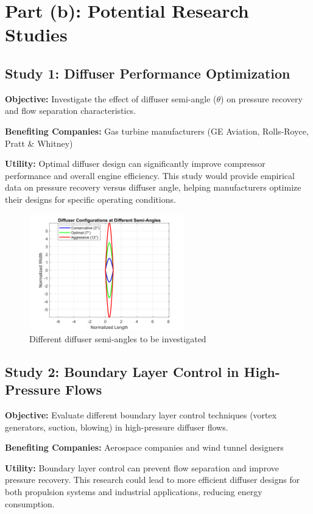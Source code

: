 \documentclass[12pt]{article}
\begin{document}
\section*{Part (b): Potential Research Studies}

\subsection*{Study 1: Diffuser Performance Optimization}
\textbf{Objective:} Investigate the effect of diffuser semi-angle ($\theta$) on pressure recovery and flow separation characteristics.

\textbf{Benefiting Companies:} Gas turbine manufacturers (GE Aviation, Rolls-Royce, Pratt \& Whitney)

\textbf{Utility:} Optimal diffuser design can significantly improve compressor performance and overall engine efficiency. This study would provide empirical data on pressure recovery versus diffuser angle, helping manufacturers optimize their designs for specific operating conditions.

\begin{figure}[H]
    \centering
    \includegraphics[width=0.6\textwidth]{diffuser_configs.png}
    \caption{Different diffuser semi-angles to be investigated}
    \label{fig:diffuser}
\end{figure}

\subsection*{Study 2: Boundary Layer Control in High-Pressure Flows}
\textbf{Objective:} Evaluate different boundary layer control techniques (vortex generators, suction, blowing) in high-pressure diffuser flows.

\textbf{Benefiting Companies:} Aerospace companies and wind tunnel designers

\textbf{Utility:} Boundary layer control can prevent flow separation and improve pressure recovery. This research could lead to more efficient diffuser designs for both propulsion systems and industrial applications, reducing energy consumption.
\end{document}
